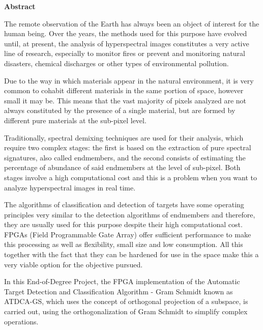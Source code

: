 

\begin{center}
{\bf \Huge Abstract}

  \end{center}

The remote observation of the Earth has always been an object of interest for the human being. Over the years, the methods used for this purpose have evolved until, at present, the analysis of hyperspectral images constitutes a very active line of research, especially to monitor fires or prevent and monitoring natural disasters, chemical discharges or other types of environmental pollution.

Due to the way in which materials appear in the natural environment, it is very common to cohabit different materials in the same portion of space, however small it may be. This means that the vast majority of pixels analyzed are not always constituted by the presence of a single material, but are formed by different pure materials at the sub-pixel level.

Traditionally, spectral demixing techniques are used for their analysis, which require two complex stages: the first is based on the extraction of pure spectral signatures, also called endmembers, and the second consists of estimating the percentage of abundance of said endmembers at the level of sub-pixel. Both stages involve a high computational cost and this is a problem when you want to analyze hyperspectral images in real time.

The algorithms of classification and detection of targets have some operating principles very similar to the detection algorithms of endmembers and therefore, they are usually used for this purpose despite their high computational cost. FPGAs (Field Programmable Gate Array) offer sufficient performance to make this processing as well as flexibility, small size and low consumption. All this together with the fact that they can be hardened for use in the space make this a very viable option for the objective pursued.

In this End-of-Degree Project, the FPGA implementation of the Automatic Target Detection and Classification Algorithm - Gram Schmidt known as ATDCA-GS, which uses the concept of orthogonal projection of a subspace, is carried out, using the orthogonalization of Gram Schmidt to simplify complex operations.

